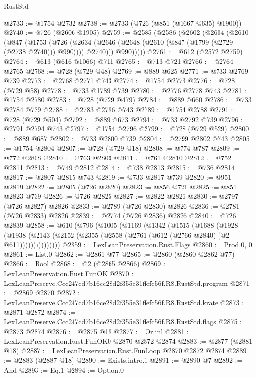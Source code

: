 \begin{lexlean}{RustStd}
\begin{coremodule}
@2733 := @1754 @2732
@2738 := @2733 (@726 (@851 (@1667 @635) @1900))
@2740 := @726 (@2606 @1905)
@2759 := @2585
    (@2586
      (@2602
        (@2604
          (@2610
            (@847
              (@1753
                (@726
                  (@2634 (@2646 (@2648 (@2610 (@847 (@1799 (@2729 (@2738 @2740))) @990)))) @2740)))
              @990)))))
@2761 := @612 (@2572 @2759)
@2764 := @613 (@616 @1066) @711
@2765 := @713 @721
@2766 := @2764 @2765
@2768 := @728 (@729 @48)
@2769 := @889 @625
@2771 := @733 @2769 @739
@2773 := @2768 @2771 @743
@2774 := @1754 @2773
@2776 := @728 (@729 @58)
@2778 := @733 @1789 @739
@2780 := @2776 @2778 @743
@2781 := @1754 @2780
@2783 := @728 (@729 @479)
@2784 := @889 @660
@2786 := @733 @2784 @739
@2788 := @2783 @2786 @743
@2789 := @1754 @2788
@2791 := @728 (@729 @504)
@2792 := @889 @673
@2794 := @733 @2792 @739
@2796 := @2791 @2794 @743
@2797 := @1754 @2796
@2799 := @728 (@729 @529)
@2800 := @889 @687
@2802 := @733 @2800 @739
@2804 := @2799 @2802 @743
@2805 := @1754 @2804
@2807 := @728 (@729 @18)
@2808 := @774 @787
@2809 := @772 @2808
@2810 := @763 @2809
@2811 := @761 @2810
@2812 := @752 @2811
@2813 := @749 @2812
@2814 := @738 @2813
@2815 := @736 @2814
@2817 := @2807 @2815 @743
@2819 := @733 @2817 @739
@2820 := @951 @2819
@2822 := @2805 (@726 @2820)
@2823 := @856 @721
@2825 := @851 @2823 @739
@2826 := @726 @2825
@2827 := @2822 @2826
@2830 := @2797 (@726 @2827) @2826
@2833 := @2789 (@726 @2830) @2826
@2836 := @2781 (@726 @2833) @2826
@2839 := @2774 (@726 @2836) @2826
@2840 := @726 @2839
@2858 := @610
    (@796
      (@1005
        (@1169
          (@1342
            (@1515
              (@1688
                (@1928
                  (@1938
                    (@2143 (@2152 (@2355 (@2558 (@2761 (@612 (@2766 @2840) (@2 @611)))))))))))))))
@2859 := LexLeanPreservation.Rust.Flags
@2860 := Prod.{0, 0}
@2861 := List.{0}
@2862 := @2861 @77
@2865 := @2860 (@2860 @2862 @77)
@2866 := Bool
@2868 := @2 (@2865 @2866)
@2869 := LexLeanPreservation.Rust.FunOK
@2870 := LexLeanPreserve.Ccc247cd7b16ce28d2f355e31ffefc56f.R8.RustStd.program
@2871 := @2869 @2870
@2872 := LexLeanPreserve.Ccc247cd7b16ce28d2f355e31ffefc56f.R8.RustStd.krate
@2873 := @2871 @2872
@2874 := LexLeanPreserve.Ccc247cd7b16ce28d2f355e31ffefc56f.R8.RustStd.flags
@2875 := @2873 @2874
@2876 := @2875 @18
@2877 := Or.inl
@2881 := LexLeanPreservation.Rust.FunOK0 @2870 @2872 @2874
@2883 := @2877 (@2881 @18)
@2887 := LexLeanPreservation.Rust.FunLoop @2870 @2872 @2874
@2889 := @2883 (@2887 @18)
@2890 := Exists.intro.{1}
@2891 := @2890 @7
@2892 := And
@2893 := Eq.{1}
@2894 := Option.{0}

\end{coremodule}
\end{lexlean}
